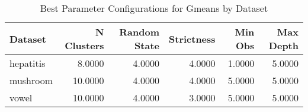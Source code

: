 \begin{table*}[ht!]
\caption{Best Parameter Configurations for Gmeans by Dataset}
\label{tab:best_configs_gmeans_config}
\begin{tabular}{lrrrrr}
Dataset & N Clusters & Random State & Strictness & Min Obs & Max Depth \\\midrule

hepatitis & 8.0000 & 4.0000 & 4.0000 & 1.0000 & 5.0000 \\
mushroom & 10.0000 & 4.0000 & 4.0000 & 5.0000 & 5.0000 \\
vowel & 10.0000 & 4.0000 & 3.0000 & 5.0000 & 5.0000 \\
\end{tabular}
\end{table*}
